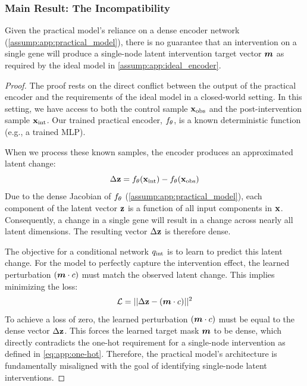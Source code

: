 \subsubsection{Main Result: The Incompatibility}
\label{app:proofs:spillover:lemma_proof}

\begin{lemma}
\label{lemma:app:incompatibility}
Given the practical model's reliance on a dense encoder network (\cref{assump:app:practical_model}), there is no guarantee that an intervention on a single gene will produce a single-node latent intervention target vector ${\bm{m}}$ as required by the ideal model in \cref{assump:app:ideal_encoder}.
\end{lemma}
\begin{proof}
The proof rests on the direct conflict between the output of the practical encoder and the requirements of the ideal model in a closed-world setting.
In this setting, we have access to both the control sample ${\mathbf{x}}_{\text{obs}}$ and the post-intervention sample ${\mathbf{x}}_{\text{int}}$.
Our trained practical encoder, $f_\theta$, is a known deterministic function (e.g., a trained MLP).

When we process these known samples, the encoder produces an approximated latent change:
\begin{equation}
    \Delta{\mathbf{z}} = f_\theta({\mathbf{x}}_{\text{int}}) - f_\theta({\mathbf{x}}_{\text{obs}})
\end{equation}
Due to the dense Jacobian of $f_\theta$ (\cref{assump:app:practical_model}), each component of the latent vector ${\mathbf{z}}$ is a function of all input components in ${\mathbf{x}}$.
Consequently, a change in a single gene will result in a change across nearly all latent dimensions.
The resulting vector $\Delta{\mathbf{z}}$ is therefore dense.

The objective for a conditional network $q_{\text{int}}$ is to learn to predict this latent change.
For the model to perfectly capture the intervention effect, the learned perturbation $({\bm{m}} \cdot c)$ must match the observed latent change.
This implies minimizing the loss:
\begin{equation}
    \mathcal{L} = || \Delta{\mathbf{z}} - ({\bm{m}} \cdot c) ||^2
\end{equation}
To achieve a loss of zero, the learned perturbation $({\bm{m}} \cdot c)$ must be equal to the dense vector $\Delta{\mathbf{z}}$.
This forces the learned target mask ${\bm{m}}$ to be dense, which directly contradicts the one-hot requirement for a single-node intervention as defined in \cref{eq:app:one-hot}.
Therefore, the practical model's architecture is fundamentally misaligned with the goal of identifying single-node latent interventions.
\end{proof}

